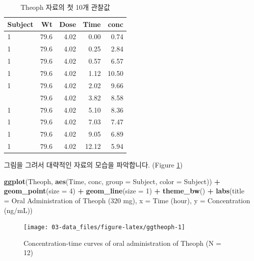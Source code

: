 \documentclass[
  12pt,
]{krantz}
\newenvironment{Shaded}{\begin{snugshade}}{\end{snugshade}}
\newcommand{\DataTypeTok}[1]{\textcolor[rgb]{0.13,0.29,0.53}{#1}}
\newcommand{\DecValTok}[1]{\textcolor[rgb]{0.00,0.00,0.81}{#1}}
\newcommand{\KeywordTok}[1]{\textcolor[rgb]{0.13,0.29,0.53}{\textbf{#1}}}
\newcommand{\NormalTok}[1]{#1}
\newcommand{\OperatorTok}[1]{\textcolor[rgb]{0.81,0.36,0.00}{\textbf{#1}}}
\newcommand{\StringTok}[1]{\textcolor[rgb]{0.31,0.60,0.02}{#1}}
\begin{document}
\begin{table}

\caption{\label{tab:head}Theoph 자료의 첫 10개 관찰값}
\centering
\begin{tabular}[t]{lrrrr}
\toprule
Subject & Wt & Dose & Time & conc\\
\midrule
1 & 79.6 & 4.02 & 0.00 & 0.74\\
1 & 79.6 & 4.02 & 0.25 & 2.84\\
1 & 79.6 & 4.02 & 0.57 & 6.57\\
1 & 79.6 & 4.02 & 1.12 & 10.50\\
1 & 79.6 & 4.02 & 2.02 & 9.66\\
\addlinespace
1 & 79.6 & 4.02 & 3.82 & 8.58\\
1 & 79.6 & 4.02 & 5.10 & 8.36\\
1 & 79.6 & 4.02 & 7.03 & 7.47\\
1 & 79.6 & 4.02 & 9.05 & 6.89\\
1 & 79.6 & 4.02 & 12.12 & 5.94\\
\bottomrule
\end{tabular}
\end{table}

그림을 그려서 대략적인 자료의 모습을 파악합니다. (Figure \ref{fig:ggtheoph})

\begin{Shaded}
\begin{Highlighting}[]
\KeywordTok{ggplot}\NormalTok{(Theoph, }\KeywordTok{aes}\NormalTok{(Time, conc, }\DataTypeTok{group =}\NormalTok{ Subject, }\DataTypeTok{color =}\NormalTok{ Subject)) }\OperatorTok{+}
\StringTok{  }\KeywordTok{geom\_point}\NormalTok{(}\DataTypeTok{size =} \DecValTok{4}\NormalTok{) }\OperatorTok{+}\StringTok{ }
\StringTok{  }\KeywordTok{geom\_line}\NormalTok{(}\DataTypeTok{size =} \DecValTok{1}\NormalTok{) }\OperatorTok{+}
\StringTok{  }\KeywordTok{theme\_bw}\NormalTok{() }\OperatorTok{+}
\StringTok{  }\KeywordTok{labs}\NormalTok{(}\DataTypeTok{title =} \StringTok{\textquotesingle{}Oral Administration of Theoph (320 mg)\textquotesingle{}}\NormalTok{,}
       \DataTypeTok{x =} \StringTok{\textquotesingle{}Time (hour)\textquotesingle{}}\NormalTok{, }\DataTypeTok{y =} \StringTok{\textquotesingle{}Concentration (ng/mL)\textquotesingle{}}\NormalTok{)}
\end{Highlighting}
\end{Shaded}

\begin{figure}
\texttt{[image: 03-data\_files/figure-latex/ggtheoph-1]} \caption{Concentration-time curves of oral administration of Theoph (N = 12)}\label{fig:ggtheoph}
\end{figure}
\end{document}
